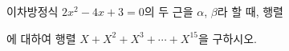 이차방정식 $2x^2-4x+3=0$의 두 근을 $\alpha$, $\beta$라 할 때, 행렬\par\smallskip{}\par\smallskip\noindent 에 대하여 행렬 $X+X^2+X^3+\cdots+X^{15}$을 구하시오.
